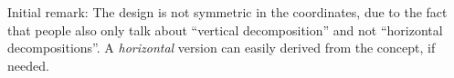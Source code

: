 
Initial remark: The design is not symmetric in the coordinates, due to the fact
that people also only talk about ``vertical decomposition'' and not 
``horizontal decompositions''. A {\it horizontal} version can easily
derived from the concept, if needed. 






